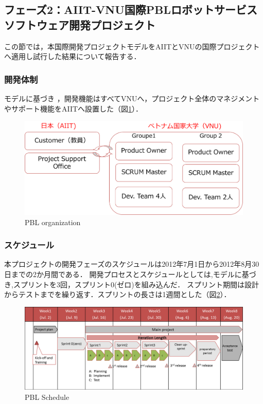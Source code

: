 \documentclass[a4j, 12Q, twocolumn, twoside]{jsarticle}
\begin{document}
\subsection{フェーズ2：AIIT-VNU国際PBLロボットサービスソフトウェア開発プロジェクト}

この節では，本国際開発プロジェクトモデルをAIITとVNUの国際プロジェクトへ適用し試行した結果について報告する．

\subsubsection{開発体制}
モデルに基づき ，開発機能はすべてVNUへ，プロジェクト全体のマネジメントやサポート機能をAIITへ設置した（図\ref{fig:pblorganization}）．
\begin{figure}
  \begin{center}
    \includegraphics[width=\columnwidth]{./figures/PBL_organization.png}
    \caption{PBL organization}
    \label{fig:pblorganization}
  \end{center}
\end{figure}



\subsubsection{スケジュール}
本プロジェクトの開発フェーズのスケジュールは2012年7月1日から2012年8月30日までの2か月間である．
開発プロセスとスケジュールとしては,モデルに基づき,スプリントを3回，スプリント0(ゼロ)を組み込んだ．
スプリント期間は設計からテストまでを繰り返す．スプリントの長さは1週間とした（図\ref{fig:PBLSchedule}）．
\begin{figure}
  \begin{center}
    \includegraphics[width=\columnwidth]{./figures/PBLSchedule.png}
    \caption{PBL Schedule}
    \label{fig:PBLSchedule}
  \end{center}
\end{figure}
\end{document}

